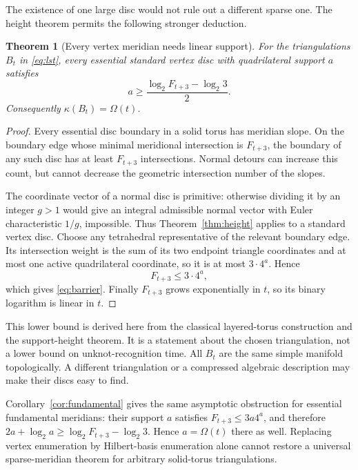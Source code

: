 \documentclass[11pt]{article}
\newtheorem{theorem}{Theorem}[section]
\theoremstyle{definition}
\theoremstyle{remark}
\begin{document}
The existence of one large disc would not rule out a different sparse one.
The height theorem permits the following stronger deduction.

\begin{theorem}[Every vertex meridian needs linear support]
\label{thm:barrier}
For the triangulations $B_t$ in \eqref{eq:lst}, every essential standard
vertex disc with quadrilateral support $a$ satisfies
\begin{equation}
 a\ge\frac{\log_2 F_{t+3}-\log_2 3}{2}.
 \label{eq:barrier}
\end{equation}
Consequently $\kappa(B_t)=\Omega(t)$.
\end{theorem}
\begin{proof}
Every essential disc boundary in a solid torus has meridian slope. On the
boundary edge whose minimal meridional intersection is $F_{t+3}$, the
boundary of any such disc has at least $F_{t+3}$ intersections. Normal
detours can increase this count, but cannot decrease the geometric
intersection number of the slopes.

The coordinate vector of a normal disc is primitive: otherwise dividing it
by an integer $g>1$ would give an integral admissible normal vector with
Euler characteristic $1/g$, impossible. Thus Theorem~\ref{thm:height}
applies to a standard vertex disc. Choose any tetrahedral representative of
the relevant boundary edge. Its intersection weight is the sum of its
two endpoint triangle coordinates and at most one active quadrilateral
coordinate, so it is at most $3\cdot4^a$. Hence
\[
 F_{t+3}\le3\cdot4^a,
\]
which gives \eqref{eq:barrier}. Finally $F_{t+3}$ grows exponentially in $t$,
so its binary logarithm is linear in $t$.
\end{proof}

This lower bound is derived here from the classical layered-torus construction
and the support-height theorem. It is a statement about the chosen
triangulation, not a lower bound on unknot-recognition time. All $B_t$ are the
same simple manifold topologically. A different triangulation or a compressed
algebraic description may make their discs easy to find.

Corollary~\ref{cor:fundamental} gives the same asymptotic obstruction for
essential fundamental meridians: their support $a$ satisfies
$F_{t+3}\le3a4^a$, and therefore
$2a+\log_2 a\ge\log_2 F_{t+3}-\log_2 3$. Hence $a=\Omega(t)$ there as well.
Replacing vertex enumeration by Hilbert-basis enumeration alone cannot
restore a universal sparse-meridian theorem for arbitrary solid-torus
triangulations.
\end{document}
